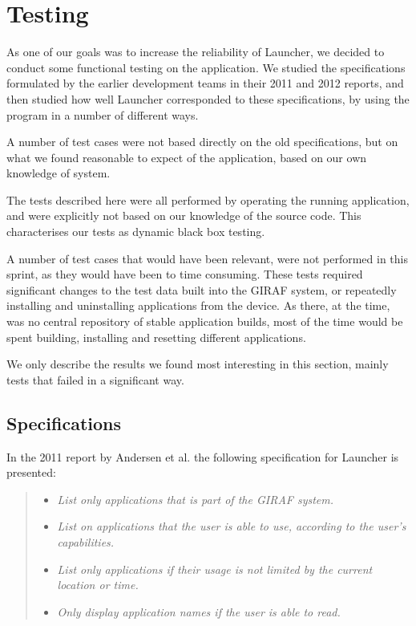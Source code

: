 \section{Testing}
\label{sec:testing_sprint1}
As one of our goals was to increase the reliability of Launcher, we decided to conduct some functional testing on the application.
We studied the specifications formulated by the earlier development teams in their 2011 \cite{launcher2011} and 2012 \cite{launcher2012} reports, and then studied how well Launcher corresponded to these specifications, by using the program in a number of different ways. 

A number of test cases were not based directly on the old specifications, but on what we found reasonable to expect of the application, based on our own knowledge of system.

The tests described here were all performed by operating the running application, and were explicitly not based on our knowledge of the source code. This characterises our tests as dynamic black box testing. 

A number of test cases that would have been relevant, were not performed in this sprint, as they would have been to time consuming. These tests required significant changes to the test data built into the GIRAF system, or repeatedly installing and uninstalling applications from the device. As there, at the time, was no central repository of stable application builds, most of the time would be spent building, installing and resetting different applications.

We only describe the results we found most interesting in this section, mainly tests that failed in a significant way. 

\subsection{Specifications}
In the 2011 report by Andersen et al. \cite{launcher2011} the following specification for Launcher is presented:
\begin{quote}
\begin{itemize}
	\item \textit{List only applications that is part of the GIRAF system.}
	\item \textit{List on applications that the user is able to use, according to the user's capabilities.}
	\item \textit{List only applications if their usage is not limited by the current location or time.}
	\item \textit{Only display application names if the user is able to read.}
\end{itemize}
\end{quote}

